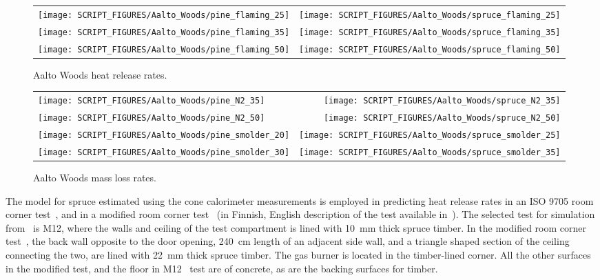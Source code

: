 \begin{figure}[!h]
\begin{tabular*}{\textwidth}{l@{\extracolsep{\fill}}r}
\texttt{[image: SCRIPT\_FIGURES/Aalto\_Woods/pine\_flaming\_25]} &
\texttt{[image: SCRIPT\_FIGURES/Aalto\_Woods/spruce\_flaming\_25]} \\
\texttt{[image: SCRIPT\_FIGURES/Aalto\_Woods/pine\_flaming\_35]} &
\texttt{[image: SCRIPT\_FIGURES/Aalto\_Woods/spruce\_flaming\_35]} \\
\texttt{[image: SCRIPT\_FIGURES/Aalto\_Woods/pine\_flaming\_50]} &
\texttt{[image: SCRIPT\_FIGURES/Aalto\_Woods/spruce\_flaming\_50]} \\
\end{tabular*}
\caption[Aalto Woods heat release rates]{Aalto Woods heat release rates.}
\label{Aalto_Woods_HRR}
\end{figure}

\FloatBarrier

\begin{figure}[p]
\begin{tabular*}{\textwidth}{l@{\extracolsep{\fill}}r}
\texttt{[image: SCRIPT\_FIGURES/Aalto\_Woods/pine\_N2\_35]} &
\texttt{[image: SCRIPT\_FIGURES/Aalto\_Woods/spruce\_N2\_35]} \\
\texttt{[image: SCRIPT\_FIGURES/Aalto\_Woods/pine\_N2\_50]} &
\texttt{[image: SCRIPT\_FIGURES/Aalto\_Woods/spruce\_N2\_50]} \\
\texttt{[image: SCRIPT\_FIGURES/Aalto\_Woods/pine\_smolder\_20]} &
\texttt{[image: SCRIPT\_FIGURES/Aalto\_Woods/spruce\_smolder\_25]} \\
\texttt{[image: SCRIPT\_FIGURES/Aalto\_Woods/pine\_smolder\_30]} &
\texttt{[image: SCRIPT\_FIGURES/Aalto\_Woods/spruce\_smolder\_35]}
\end{tabular*}
\caption[Aalto Woods mass loss rates]{Aalto Woods mass loss rates.}
\label{Aalto_Woods_MLR}
\end{figure}

\FloatBarrier

The model for spruce estimated using the cone calorimeter measurements is employed in predicting heat release rates in an ISO 9705 room corner test~\cite{Sundstrom:1998}, and in a modified room corner test~\cite{Hietaniemi:2001} (in Finnish, English description of the test available in~\cite{Hietaniemi:1}). The selected test for simulation from~\cite{Sundstrom:1998} is M12, where the walls and ceiling of the test compartment is lined with 10~mm thick spruce timber. In the modified room corner test~\cite{Hietaniemi:2001}, the back wall opposite to the door opening, 240~cm length of an adjacent side wall, and a triangle shaped section of the ceiling connecting the two, are lined with 22~mm thick spruce timber. The gas burner is located in the timber-lined corner. All the other surfaces in the modified test, and the floor in M12~\cite{Sundstrom:1998} test are of concrete, as are the backing surfaces for timber.


